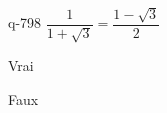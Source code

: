 \begin{truefalse}{q-798}
$\dfrac{1}{1+\sqrt{3}}=\dfrac{1-\sqrt{3}}{2}$
\item Vrai
\item* Faux
\end{truefalse}

